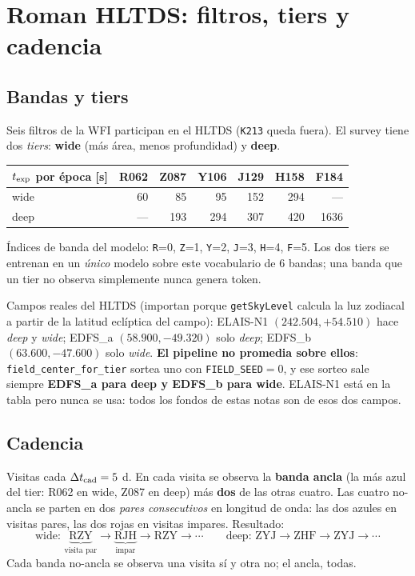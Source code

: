 \documentclass[11pt,a4paper]{article}
\newcommand{\code}[1]{\texttt{\small #1}}
\begin{document}
\section{Roman HLTDS: filtros, tiers y cadencia}

\subsection{Bandas y tiers}
Seis filtros de la WFI participan en el HLTDS (\code{K213} queda fuera). El survey tiene dos
\emph{tiers}: \textbf{wide} (más área, menos profundidad) y \textbf{deep}.

\begin{center}
\begin{tabular}{lrrrrrr}
\toprule
$t_{\rm exp}$ por época [s] & R062 & Z087 & Y106 & J129 & H158 & F184 \\
\midrule
wide & 60 & 85 & 95 & 152 & 294 & --- \\
deep & --- & 193 & 294 & 307 & 420 & 1636 \\
\bottomrule
\end{tabular}
\end{center}

\noindent Índices de banda del modelo: \code{R}=0, \code{Z}=1, \code{Y}=2, \code{J}=3, \code{H}=4,
\code{F}=5. Los dos tiers se entrenan en un \emph{único} modelo sobre este vocabulario de 6 bandas;
una banda que un tier no observa simplemente nunca genera token.

Campos reales del HLTDS (importan porque \code{getSkyLevel} calcula la luz zodiacal a partir de la
latitud eclíptica del campo): ELAIS-N1 $(242.504, +54.510)$ hace \emph{deep} y \emph{wide};
EDFS\_a $(58.900, -49.320)$ solo \emph{deep}; EDFS\_b $(63.600, -47.600)$ solo \emph{wide}.
\textbf{El pipeline no promedia sobre ellos}: \code{field\_center\_for\_tier} sortea uno con
\code{FIELD\_SEED}$=0$, y ese sorteo sale siempre \textbf{EDFS\_a para deep y EDFS\_b para wide}.
ELAIS-N1 está en la tabla pero nunca se usa: todos los fondos de estas notas son de esos dos campos.

\subsection{Cadencia}
Visitas cada $\Delta t_{\rm cad} = 5$ d. En cada visita se observa la \textbf{banda ancla} (la más
azul del tier: R062 en wide, Z087 en deep) más \textbf{dos} de las otras cuatro. Las cuatro
no-ancla se parten en dos \emph{pares consecutivos} en longitud de onda: las dos azules en visitas
pares, las dos rojas en visitas impares. Resultado:
\[
\text{wide: } \underbrace{\text{RZY}}_{\text{visita par}} \to \underbrace{\text{RJH}}_{\text{impar}} \to \text{RZY} \to \cdots
\qquad
\text{deep: } \text{ZYJ} \to \text{ZHF} \to \text{ZYJ} \to \cdots
\]
Cada banda no-ancla se observa una visita sí y otra no; el ancla, todas.
\end{document}
